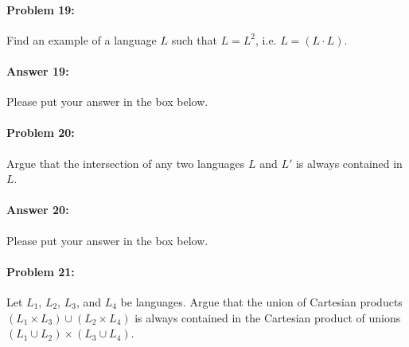 \documentclass[10pt]{article}
\newenvironment{AnswerBox}{\begin{mdframed}[style=simple]}{\end{mdframed}}
\begin{document}
\noindent\hrulefill %

\paragraph{Problem 19:}
Find an example of a language $L$ such that $L=L^2$, i.e. $L=(L\cdot L)$.

\paragraph{Answer 19:} Please put your answer in the box below.

\begin{AnswerBox}%


\end{AnswerBox}%

\noindent\hrulefill %

\paragraph{Problem 20:}
Argue that the intersection of any two languages $L$ and $L'$ is always
contained in $L$.

\paragraph{Answer 20:} Please put your answer in the box below.

\begin{AnswerBox}%


\end{AnswerBox}%

\noindent\hrulefill %

\paragraph{Problem 21:}
Let $L_1$, $L_2$, $L_3$, and $L_4$ be languages. Argue that the union of
Cartesian products $(L_1 \times L_3) \cup (L_2 \times L_4)$ is always contained
in the Cartesian product of unions $(L_1 \cup L_2) \times (L_3 \cup L_4)$.
\end{document}
